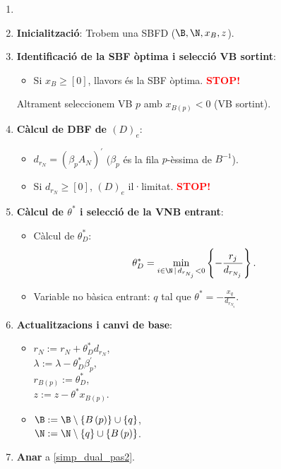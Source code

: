 \begin{alg}
    \begin{enumerate}
        \item[]
        \item {\bf Inicialització}: Trobem una SBFD ($\B, \N, x_B, z$).
        \item \label{simp_dual_pas2} {\bf Identificació de la SBF òptima i selecció VB sortint}:
            \begin{itemize}
                \item Si $x_B \geq \left[0\right]$, llavors és la SBF òptima. \textcolor{red}{\bf STOP!}
            \end{itemize}
            Altrament seleccionem VB $p$ amb $x_{B\left(p\right)} < 0$ (VB sortint).
        \item {\bf Càlcul de DBF de $\left(D\right)_e$}:
            \begin{itemize}
                \item $d_{r_N} = \left(\beta_p A_N\right)^\prime$ ($\beta_p$ és la fila $p$-èssima de $B^{-1}$).
                \item Si $d_{r_N} \geq \left[0\right]$, $\left(D\right)_e$ il·limitat. \textcolor{red}{\bf STOP!}
            \end{itemize}
        \item {\bf Càlcul de $\theta^*$ i selecció de la VNB entrant}:
            \begin{itemize}
                \item Càlcul de $\theta_D^*$: 
                    \[\theta_D^* = \min_{i \in \N \,|\, d_{r_{N_j}} < 0} \left\{-\frac{r_j}{d_{r_{N_j}}} \right\}.\]
                \item Variable no bàsica entrant: $q$ tal que $\theta^* = -\frac{x_q}{d_{r_{N_q}}}$.
            \end{itemize}
        \item {\bf Actualitzacions i canvi de base}:
            \begin{itemize}
                \item $r_N := r_N + \theta_D^* d_{r_N}$, \\
                    $\lambda := \lambda - \theta_D^* \beta_p^\prime$, \\
                    $r_{B\left(p\right)} := \theta_D^*$, \\
                    $z := z - \theta^* x_{B\left(p\right)}$.
                \item $\B := \B \setminus \left\{B\left(p\right)\right\} \cup \left\{q\right\}$, \\
                    $\N := \N \setminus \left\{q\right\} \cup \left\{B\left(p\right)\right\}$.
            \end{itemize}
        \item {\bf Anar} a \ref{simp_dual_pas2}.
    \end{enumerate}
\end{alg}

